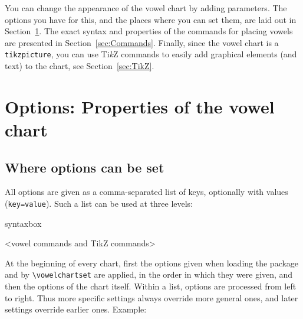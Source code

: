 \documentclass[a4paper,11pt]{article}
\newcommand\cmd[1]{\texttt{\textbackslash #1}}
\newcommand\opt[1]{\texttt{#1}}
\begin{document}
You can change the appearance of the vowel chart by adding parameters. The options you have for this, and the places where you can set them, are laid out in Section~\ref{sec:Options}.
The exact syntax and properties of the commands for placing vowels are presented in Section~\ref{sec:Commands}.
Finally, since the vowel chart is a \texttt{tikzpicture}, you can use Ti\textit{k}Z commands to easily add graphical elements (and text) to the chart, see Section~\ref{sec:TikZ}.




\section{Options: Properties of the vowel chart} \label{sec:Options}

\subsection{Where options can be set} \label{sec:optionsets}

All options are given as a comma-separated list of keys, optionally with values (\opt{key=value}). Such a list can be used at three levels:

\begin{tcblisting}{syntaxbox}
\begin{vowelchart}[<options>]
  <vowel commands and TikZ commands>
\end{vowelchart}


\usepackage[<options>]{vowelchart}
\end{tcblisting}

\noindent
At the beginning of every chart, first the options given when loading the package and by \cmd{vowelchartset} are applied, in the order in which they were given, and then the options of the chart itself. Within a list, options are processed from left to right. Thus more specific settings always override more general ones, and later settings override earlier ones. Example:

\end{document}
